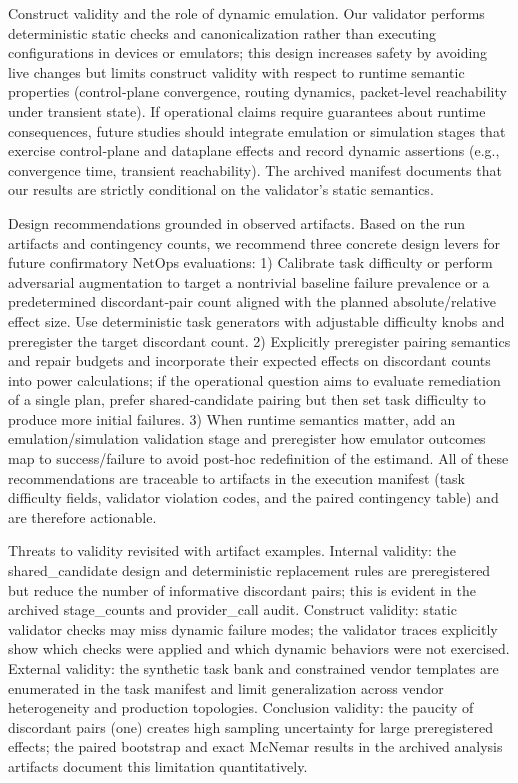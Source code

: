 \documentclass[conference]{IEEEtran}
\begin{document}
Construct validity and the role of dynamic emulation. Our validator performs deterministic static checks and canonicalization rather than executing configurations in devices or emulators; this design increases safety by avoiding live changes but limits construct validity with respect to runtime semantic properties (control‑plane convergence, routing dynamics, packet‑level reachability under transient state). If operational claims require guarantees about runtime consequences, future studies should integrate emulation or simulation stages that exercise control‑plane and dataplane effects and record dynamic assertions (e.g., convergence time, transient reachability). The archived manifest documents that our results are strictly conditional on the validator's static semantics.

Design recommendations grounded in observed artifacts. Based on the run artifacts and contingency counts, we recommend three concrete design levers for future confirmatory NetOps evaluations:
1) Calibrate task difficulty or perform adversarial augmentation to target a nontrivial baseline failure prevalence or a predetermined discordant‑pair count aligned with the planned absolute/relative effect size. Use deterministic task generators with adjustable difficulty knobs and preregister the target discordant count. 2) Explicitly preregister pairing semantics and repair budgets and incorporate their expected effects on discordant counts into power calculations; if the operational question aims to evaluate remediation of a single plan, prefer shared‑candidate pairing but then set task difficulty to produce more initial failures. 3) When runtime semantics matter, add an emulation/simulation validation stage and preregister how emulator outcomes map to success/failure to avoid post‑hoc redefinition of the estimand. All of these recommendations are traceable to artifacts in the execution manifest (task difficulty fields, validator violation codes, and the paired contingency table) and are therefore actionable.

Threats to validity revisited with artifact examples. Internal validity: the shared\_candidate design and deterministic replacement rules are preregistered but reduce the number of informative discordant pairs; this is evident in the archived stage\_counts and provider\_call audit. Construct validity: static validator checks may miss dynamic failure modes; the validator traces explicitly show which checks were applied and which dynamic behaviors were not exercised. External validity: the synthetic task bank and constrained vendor templates are enumerated in the task manifest and limit generalization across vendor heterogeneity and production topologies. Conclusion validity: the paucity of discordant pairs (one) creates high sampling uncertainty for large preregistered effects; the paired bootstrap and exact McNemar results in the archived analysis artifacts document this limitation quantitatively.
\end{document}

